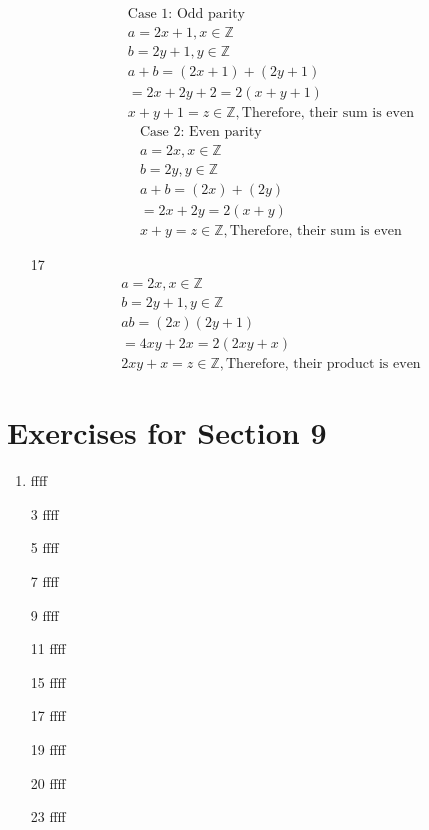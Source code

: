 \documentclass[12pt]{article}
\begin{document}
\begin{enumerate}
\begin{multicols}{2}
\begin{equation*}
\begin{split}
		\text{Case 1: Odd parity}\\
		a = 2x+1, x \in \mathbb{Z}\\
		b = 2y+1, y \in \mathbb{Z}\\
		a+b = (2x + 1) + (2y + 1)\\
		= 2x + 2y + 2 = 2(x+y+1)\\
		x+y+1 = z \in \mathbb{Z}, \text{Therefore, their sum is even}
	    \end{split}
	\end{equation*}
	\begin{equation*}
	    \begin{split}
		\text{Case 2: Even parity}\\
		a = 2x, x \in \mathbb{Z}\\
		b = 2y, y \in \mathbb{Z}\\
		a+b = (2x) + (2y)\\
		= 2x + 2y = 2(x+y)\\
		x+y = z \in \mathbb{Z}, \text{Therefore, their sum is even}
	    \end{split}
	\end{equation*}
	\end{multicols}
    \item [17] 
	\begin{equation*}
	    \begin{split}
		a = 2x, x \in \mathbb{Z}\\
		b = 2y + 1, y \in \mathbb{Z}\\
		ab = (2x)(2y + 1)\\
		= 4xy + 2x = 2(2xy + x)\\
		2xy + x = z \in \mathbb{Z}, \text{Therefore, their product is even}
	    \end{split}
	\end{equation*}
\end{enumerate}
\section*{Exercises for Section 9}
\begin{enumerate}
	\item ffff
	\item [3] ffff
	\item [5] ffff
	\item [7] ffff
	\item [9] ffff
	\item [11] ffff
	\item [15] ffff
	\item [17] ffff
	\item [19] ffff
	\item [20] ffff
	\item [23] ffff
\end{enumerate}
\end{document}
